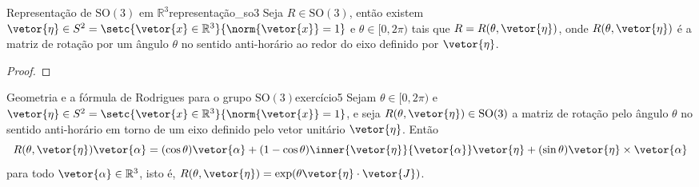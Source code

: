 \begin{proposition}{Representação de \(\mathrm{SO}(3)\) em \(\mathbb{R}^3\)}{representação_so3}
    Seja \(R \in \mathrm{SO}(3)\), então existem \(\vetor{\eta} \in S^2 = \setc{\vetor{x} \in \mathbb{R}^3}{\norm{\vetor{x}} = 1}\) e \(\theta \in [0, 2\pi)\) tais que \(R = R(\theta, \vetor{\eta})\), onde \(R(\theta, \vetor{\eta})\) é a matriz de rotação por um ângulo \(\theta\) no sentido anti-horário ao redor do eixo definido por \(\vetor{\eta}\).
\end{proposition}
\begin{proof}

\end{proof}

\begin{proposition}{Geometria e a fórmula de Rodrigues para o grupo \(\mathrm{SO}(3)\)}{exercício5}
    Sejam \(\theta\in [0,2\pi)\) e \(\vetor{\eta} \in S^2 = \setc{\vetor{x}\in \mathbb{R}^3}{\norm{\vetor{x}}= 1}\), e seja \(R(\theta, \vetor{\eta}) \in \mathrm{SO}(3)\) a matriz de rotação pelo ângulo \(\theta\) no sentido anti-horário em torno de um eixo definido pelo vetor unitário \(\vetor{\eta}\). Então
    \begin{equation*}
        R(\theta, \vetor{\eta})\vetor{\alpha} = (\cos\theta)\vetor{\alpha} + (1 - \cos\theta)\inner{\vetor{\eta}}{\vetor{\alpha}}\vetor{\eta} + (\sin\theta)\vetor{\eta}\times\vetor{\alpha}
    \end{equation*}
    para todo \(\vetor{\alpha} \in \mathbb{R}^3\), isto é, \(R(\theta, \vetor{\eta}) = \exp(\theta\vetor{\eta}\cdot\vetor{J})\).
\end{proposition}
